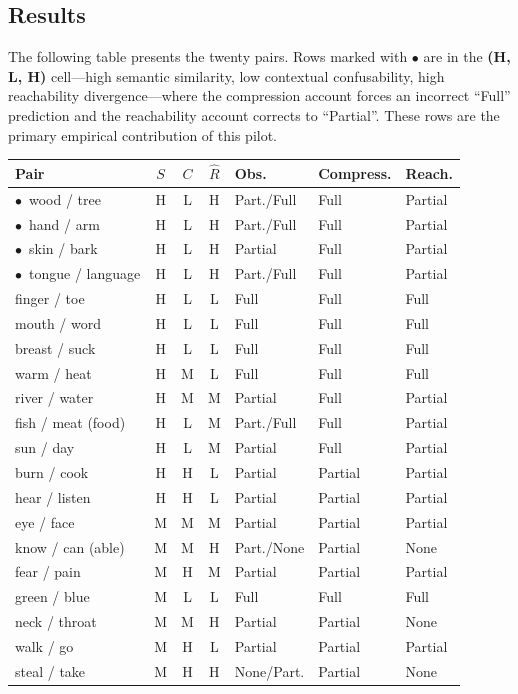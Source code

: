\documentclass[12pt]{article}
\theoremstyle{rthm}
\theoremstyle{rdef}
\theoremstyle{remark}
\begin{document}
\subsection{Results}

The following table presents the twenty pairs. Rows marked with $\bullet$ are
in the \textbf{(H, L, H)} cell---high semantic similarity, low contextual
confusability, high reachability divergence---where the compression account
forces an incorrect ``Full'' prediction and the reachability account corrects
to ``Partial''. These rows are the primary empirical contribution of this pilot.

\medskip
\begin{center}
\renewcommand{\arraystretch}{1.3}
\small
\begin{tabularx}{\textwidth}{l c c c l X X}
\toprule
\textbf{Pair} & $S$ & $C$ & $\widehat{R}$ &
\textbf{Obs.} & \textbf{Compress.} & \textbf{Reach.} \\
\midrule
$\bullet$\ wood / tree        & H & L & H & Part./Full  & Full    & Partial \\
$\bullet$\ hand / arm         & H & L & H & Part./Full  & Full    & Partial \\
$\bullet$\ skin / bark        & H & L & H & Partial     & Full    & Partial \\
$\bullet$\ tongue / language  & H & L & H & Part./Full  & Full    & Partial \\
finger / toe        & H & L & L & Full        & Full    & Full    \\
mouth / word        & H & L & L & Full        & Full    & Full    \\
breast / suck       & H & L & L & Full        & Full    & Full    \\
warm / heat         & H & M & L & Full        & Full    & Full    \\
river / water       & H & M & M & Partial     & Full    & Partial \\
fish / meat (food)  & H & L & M & Part./Full  & Full    & Partial \\
sun / day           & H & L & M & Partial     & Full    & Partial \\
burn / cook         & H & H & L & Partial     & Partial & Partial \\
hear / listen       & H & H & L & Partial     & Partial & Partial \\
eye / face          & M & M & M & Partial     & Partial & Partial \\
know / can (able)   & M & M & H & Part./None  & Partial & None    \\
fear / pain         & M & H & M & Partial     & Partial & Partial \\
green / blue        & M & L & L & Full        & Full    & Full    \\
neck / throat       & M & M & H & Partial     & Partial & None    \\
walk / go           & M & H & L & Partial     & Partial & Partial \\
steal / take        & M & H & H & None/Part.  & Partial & None    \\
\bottomrule
\end{tabularx}
\end{center}
\end{document}
